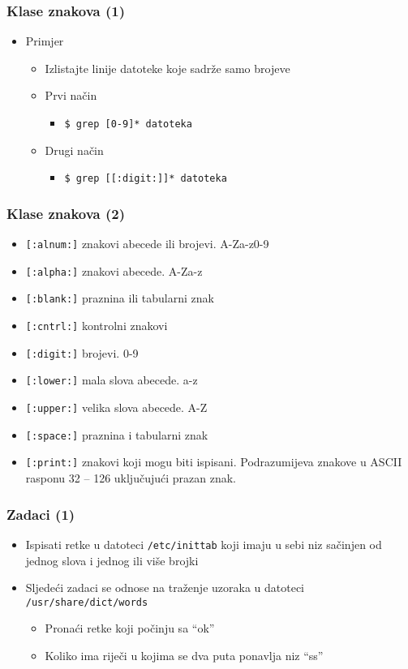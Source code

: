 \documentclass[table,usenames,dvipsnames]{beamer}
\newcommand{\shell}[1]{\texttt{#1}}
\begin{document}
\begin{frame}[t]
\frametitle{Klase znakova (1)}
\begin{itemize}
  \item Primjer
  \begin{itemize}
    \item Izlistajte linije datoteke koje sadrže samo brojeve
    \item Prvi način
    \begin{itemize}
      \item[] \shell{\$ grep [0-9]* datoteka}
    \end{itemize}
    \item Drugi način
    \begin{itemize}
      \item[] \shell{\$ grep [[:digit:]]* datoteka}
    \end{itemize}
  \end{itemize}
\end{itemize}
\end{frame}

\begin{frame}[t]
\frametitle{Klase znakova (2)}
\begin{itemize}
  \item \shell{[:alnum:]} znakovi abecede ili brojevi. A-Za-z0-9
  \item \shell{[:alpha:]} znakovi abecede. A-Za-z 
  \item \shell{[:blank:]} praznina ili tabularni znak
  \item \shell{[:cntrl:]} kontrolni znakovi
  \item \shell{[:digit:]} brojevi. 0-9
  \item \shell{[:lower:]} mala slova abecede. a-z
  \item \shell{[:upper:]} velika slova abecede. A-Z
  \item \shell{[:space:]} praznina i tabularni znak
  \item \shell{[:print:]} znakovi koji mogu biti ispisani. Podrazumijeva 
        znakove u ASCII rasponu 32 – 126 uključujući prazan znak.
\end{itemize}
\end{frame}

\begin{frame}[t]
\frametitle{Zadaci (1)}
\begin{itemize}
  \item Ispisati retke u datoteci \shell{/etc/inittab} koji imaju u sebi 
        niz sačinjen od jednog slova i jednog ili više brojki
  \item Sljedeći zadaci se odnose na traženje uzoraka u datoteci 
        \shell{/usr/share/dict/words}
  \begin{itemize}
    \item Pronaći retke koji počinju sa ``ok''
    \item Koliko ima riječi u kojima se dva puta ponavlja niz ``ss''
  \end{itemize}
\end{itemize}
\end{frame}
\end{document}
